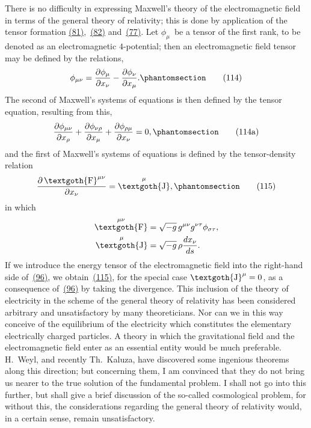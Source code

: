 \documentclass[12pt]{book}[2005/09/16]
\newcommand{\Change}[2]{#2}
\newcommand{\Add}[1]{\Change{}{#1}}
\newcommand{\PageSep}[1]{\ignorespaces}
\newcommand{\Tag}[1]{%
  \phantomsection
  \label{eqn:#1}
  \tag*{#1}
}
\newcommand{\Eqref}[1]{\hyperref[eqn:#1]{#1}}
\newcommand{\dd}{\partial}
\newcommand{\Tensor}[1]{\textgoth{#1}}
\DeclareMathOperator{\tF}{\Tensor{F}}
\DeclareMathOperator{\tJ}{\Tensor{J}}
\begin{document}
There is no difficulty in expressing Maxwell's theory
of the electromagnetic field in terms of the general theory
of relativity; this is done by application of the tensor
formation \Eqref{(81)},~\Eqref{(82)} and~\Eqref{(77)}. Let $\phi_{\mu}$~be a tensor of the
first rank, to be denoted as an electromagnetic $4$-potential;
then an electromagnetic field tensor may be defined by
the relations,
\[
\phi_{\mu\nu}
  = \frac{\dd \phi_{\mu}}{\dd x_{\nu}} - \frac{\dd \phi_{\nu}}{\dd x_{\mu}}\Add{.}
\Tag{(114)}
\]
The second of Maxwell's systems of equations is then
defined by the tensor equation, resulting from this,
\[
\frac{\dd \phi_{\mu\nu}}{\dd x_{\rho}} +
\frac{\dd \phi_{\nu\rho}}{\dd x_{\mu}} +
\frac{\dd \phi_{\rho\mu}}{\dd x_{\nu}} = 0\Add{,}
\Tag{(114a)}
\]
and the first of Maxwell's systems of equations is defined
by the tensor-density relation
\[
\frac{\dd \tF^{\mu\nu}}{\dd x_{\nu}} = \tJ^{\mu}\Add{,}
\Tag{(115)}
\]
\PageSep{108}
in which
\begin{align*}
\tF^{\mu\nu} &= \sqrt{-g}\, g^{\mu\nu} g^{\nu\tau} \phi_{\sigma\tau}\Add{,} \\
\tJ^{\mu} &= \sqrt{-g}\, \rho \frac{dx_{\nu}}{ds}.
\end{align*}
If we introduce the energy tensor of the electromagnetic
field into the right-hand side of~\Eqref{(96)}, we obtain~\Eqref{(115)},
for the special case $\tJ^{\mu} = 0$, as a consequence of~\Eqref{(96)} by
taking the divergence. This inclusion of the theory of
electricity in the scheme of the general theory of relativity
has been considered arbitrary and unsatisfactory by
many theoreticians. Nor can we in this way conceive of
the equilibrium of the electricity which constitutes the
elementary electrically charged particles. A theory in
which the gravitational field and the electromagnetic field
enter as an essential entity would be much preferable.
H.~Weyl, and recently Th.~Kaluza, have discovered some
%
%
ingenious theorems along this direction; but concerning
them, I am convinced that they do not bring us nearer to
the true solution of the fundamental problem. I shall
not go into this further, but shall give a brief discussion
of the so-called cosmological problem, for without this,
the considerations regarding the general theory of relativity
would, in a certain sense, remain unsatisfactory.
\end{document}
